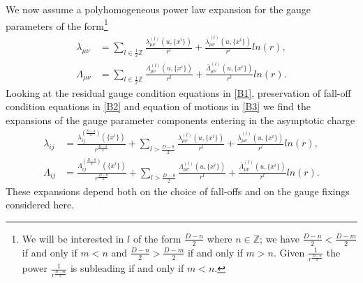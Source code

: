 \documentclass[a4paper,12pt]{article}
\begin{document}
We now assume a polyhomogeneous power law expansion for the gauge parameters of the form\footnote{We will be interested in $l$ of the form $\frac{D-n}{2}$ where $n \in \mathbb{Z}$; we have $\frac{D-n}{2}<\frac{D-m}{2}$ if and only if $m<n$ and $\frac{D-n}{2}>\frac{D-m}{2}$ if and only if $m>n$. Given $\frac{1}{r^{\frac{D-n}{2}}}$ the power $\frac{1}{r^{\frac{D-m}{2}}}$ is subleading if and only if $m<n$.}
\begin{equation}
\begin{aligned}
\lambda_{\mu \nu}&=\sum_{l\in \frac{1}{2}\mathbb{Z}}\frac{\lambda_{\mu \nu}^{(l)}(u,\{x^i\})}{r^l}+\frac{\bar{\lambda}_{\mu \nu}^{(l)}(u,\{x^i\})}{r^l}ln(r),\\
\Lambda_{\mu \nu}&=\sum_{l\in \frac{1}{2}\mathbb{Z}}\frac{\Lambda_{\mu \nu}^{(l)}(u,\{x^i\})}{r^l}+\frac{\bar{\Lambda}_{\mu \nu}^{(l)}(u,\{x^i\})}{r^l}ln(r).
\label{expgauge}
\end{aligned}
\end{equation}
Looking at the residual gauge condition equations in  \ref{B1}, preservation of fall-off condition equations in \ref{B2} and equation of motions in \ref{B3} we find the expansions of the gauge parameter components entering in the asymptotic charge
\begin{equation}
\begin{aligned}
\lambda_{ij}&=\frac{\lambda_{ij}^{(\frac{D-8}{2})}(\{x^i\})}{r^{\frac{D-8}{2}}}+\sum_{l>\frac{D-8}{2}}\frac{\lambda_{\mu \nu}^{(l)}(u,\{x^i\})}{r^l}+\frac{\bar{\lambda}_{\mu \nu}^{(l)}(u,\{x^i\})}{r^l}ln(r),\\
\Lambda_{ij}&=\frac{\Lambda_{ij}^{(\frac{D-8}{2})}(\{x^i\})}{r^{\frac{D-8}{2}}}+\sum_{l>\frac{D-8}{2}}\frac{\Lambda_{\mu \nu}^{(l)}(u,\{x^i\})}{r^l}+\frac{\bar{\Lambda}_{\mu \nu}^{(l)}(u,\{x^i\})}{r^l}ln(r).
\label{expgaugelead}
\end{aligned}
\end{equation}
These expansions depend both on the choice of fall-offs and on the gauge fixings considered here.
\end{document}
